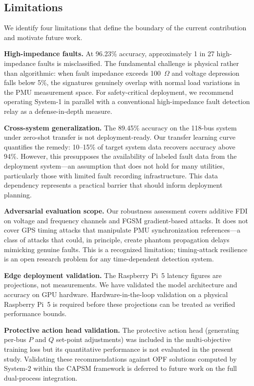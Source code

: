 \documentclass[journal]{IEEEtran}
\begin{document}
\subsection{Limitations}

We identify four limitations that define the boundary of the current contribution and motivate future work.

\textbf{High-impedance faults.} At 96.23\% accuracy, approximately 1 in 27 high-impedance faults is misclassified. The fundamental challenge is physical rather than algorithmic: when fault impedance exceeds 100~$\Omega$ and voltage depression falls below 5\%, the signatures genuinely overlap with normal load variations in the PMU measurement space. For safety-critical deployment, we recommend operating System-1 in parallel with a conventional high-impedance fault detection relay as a defense-in-depth measure.

\textbf{Cross-system generalization.} The 89.45\% accuracy on the 118-bus system under zero-shot transfer is not deployment-ready. Our transfer learning curve quantifies the remedy: 10--15\% of target system data recovers accuracy above 94\%. However, this presupposes the availability of labeled fault data from the deployment system---an assumption that does not hold for many utilities, particularly those with limited fault recording infrastructure. This data dependency represents a practical barrier that should inform deployment planning.

\textbf{Adversarial evaluation scope.} Our robustness assessment covers additive FDI on voltage and frequency channels and FGSM gradient-based attacks. It does not cover GPS timing attacks that manipulate PMU synchronization references---a class of attacks that could, in principle, create phantom propagation delays mimicking genuine faults. This is a recognized limitation; timing-attack resilience is an open research problem for any time-dependent detection system.

\textbf{Edge deployment validation.} The Raspberry Pi~5 latency figures are projections, not measurements. We have validated the model architecture and accuracy on GPU hardware. Hardware-in-the-loop validation on a physical Raspberry Pi~5 is required before these projections can be treated as verified performance bounds.

\textbf{Protective action head validation.} The protective action head (generating per-bus $P$ and $Q$ set-point adjustments) was included in the multi-objective training loss but its quantitative performance is not evaluated in the present study. Validating these recommendations against OPF solutions computed by System-2 within the CAPSM framework is deferred to future work on the full dual-process integration.
\end{document}
